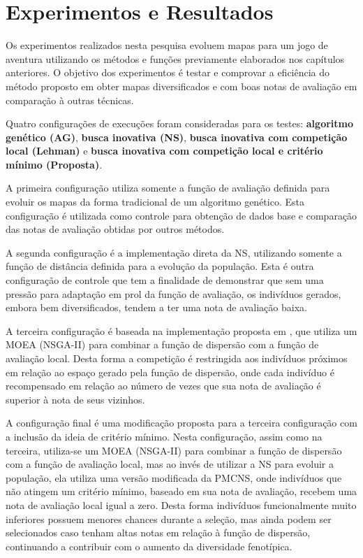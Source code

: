 
\chapter{Experimentos e Resultados}
\label{experimentos}

Os experimentos realizados nesta pesquisa evoluem mapas para um jogo de aventura utilizando os métodos e funções previamente elaborados nos capítulos anteriores. O objetivo dos experimentos é testar e comprovar a eficiência do método proposto em obter mapas diversificados e com boas notas de avaliação em comparação à outras técnicas.

Quatro configurações de execuções foram consideradas para os testes: \textbf{algoritmo genético (AG)}, \textbf{busca inovativa (NS)}, \textbf{busca inovativa com competição local (Lehman)} e \textbf{busca inovativa com competição local e critério mínimo (Proposta)}.

A primeira configuração utiliza somente a função de avaliação definida para evoluir os mapas da forma tradicional de um algoritmo genético. Esta configuração é utilizada como controle para obtenção de dados base e comparação das notas de avaliação obtidas por outros métodos.

A segunda configuração é a implementação direta da NS, utilizando somente a função de distância definida para a evolução da população. Esta é outra configuração de controle que tem a finalidade de demonstrar que sem uma pressão para adaptação em prol da função de avaliação, os indivíduos gerados, embora bem diversificados, tendem a ter uma nota de avaliação baixa.

A terceira configuração é baseada na implementação proposta em \cite{lehman2011evolving}, que utiliza um MOEA (NSGA-II) para combinar a função de dispersão com a função de avaliação local. Desta forma a competição é restringida aos indivíduos próximos em relação ao espaço gerado pela função de dispersão, onde cada indivíduo é recompensado em relação ao número de vezes que sua nota de avaliação é superior à nota de seus vizinhos.

A configuração final é uma modificação proposta para a terceira configuração com a inclusão da ideia de critério mínimo. Nesta configuração, assim como na terceira, utiliza-se um MOEA (NSGA-II) para combinar a função de dispersão com a função de avaliação local, mas ao invés de utilizar a NS para evoluir a população, ela utiliza uma versão modificada da PMCNS, onde indivíduos que não atingem um critério mínimo, baseado em sua nota de avaliação, recebem uma nota de avaliação local igual a zero. Desta forma indivíduos funcionalmente muito inferiores possuem menores chances durante a seleção, mas ainda podem ser selecionados caso tenham altas notas em relação à função de dispersão, continuando a contribuir com o aumento da diversidade fenotípica.

